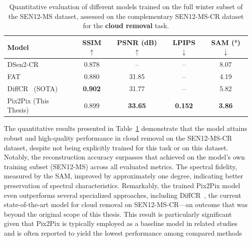 \begin{table}[!htbp]
    \centering
    \caption[Quantitative results on cloud removal]{Quantitative evaluation of different models trained on the full winter subset of the SEN12-MS dataset, assessed on the complementary SEN12-MS-CR dataset for the \textbf{cloud removal} task.}
    \begin{tabular}{lcccc}
        \toprule
        \textbf{Model}               & \textbf{SSIM $\uparrow$} & \textbf{PSNR (dB) $\uparrow$} & \textbf{LPIPS $\downarrow$} & \textbf{SAM (°) $\downarrow$} \\
        \midrule
        DSen2-CR~\cite{CR_SEN2_dRNN} & 0.878                    & --                            & --                          & 8.07                          \\
        FAT~\cite{c_guided_fus_s2ot} & 0.880                    & 31.85                         & --                          & 4.19                          \\
        DiffCR~\cite{DiffCR} (SOTA)  & \textbf{0.902}           & 31.77                         & --                          & 5.82                          \\
        Pix2Pix (This Thesis)        & 0.899                    & \textbf{33.65}                & \textbf{0.152}              & \textbf{3.86}                 \\
        \bottomrule
    \end{tabular}
    \label{tab:quantitative_result_cr}
\end{table}

The quantitative results presented in Table~\ref{tab:quantitative_result_cr} demonstrate that the model attains robust and high-quality performance in cloud removal on the SEN12-MS-CR dataset, despite not being explicitly trained for this task or on this dataset. Notably, the reconstruction accuracy surpasses that achieved on the model’s own training subset (SEN12-MS) across all evaluated metrics. The spectral fidelity, measured by the SAM, improved by approximately one degree, indicating better preservation of spectral characteristics. Remarkably, the trained Pix2Pix model even outperforms several specialized approaches, including DiffCR~\cite{DiffCR}, the current state-of-the-art model for cloud removal on SEN12-MS-CR—an outcome that was beyond the original scope of this thesis. This result is particularly significant given that Pix2Pix is typically employed as a baseline model in related studies and is often reported to yield the lowest performance among compared methods 

